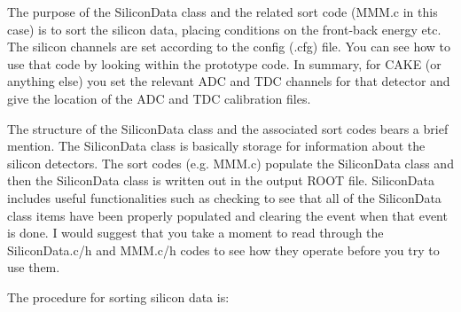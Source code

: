 \documentclass[11pt]{report}
\begin{document}
The purpose of the SiliconData class and the related sort code (MMM.c in this case) is to sort the silicon data, placing conditions on the front-back energy etc. The silicon channels are set according to the config (.cfg) file. You can see how to use that code by looking within the prototype code. In summary, for CAKE (or anything else) you set the relevant ADC and TDC channels for that detector and give the location of the ADC and TDC calibration files.

The structure of the SiliconData class and the associated sort codes bears a brief mention. The SiliconData class is basically storage for information about the silicon detectors. The sort codes (e.g. MMM.c) populate the SiliconData class and then the SiliconData class is written out in the output ROOT file. SiliconData includes useful functionalities such as checking to see that all of the SiliconData class items have been properly populated and clearing the event when that event is done. I would suggest that you take a moment to read through the SiliconData.c/h and MMM.c/h codes to see how they operate before you try to use them.

The procedure for sorting silicon data is:
\end{document}
